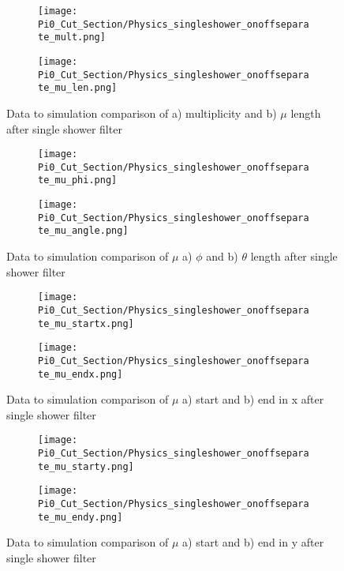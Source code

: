 \begin{figure}[H]
  \begin{subfigure}[t]{0.3\textwidth}
\texttt{[image: Pi0\_Cut\_Section/Physics\_singleshower\_onoffseparate\_mult.png]}
  \caption{ }
  \end{subfigure} 
  \hspace{34mm}
  \begin{subfigure}[t]{0.3\textwidth}
\texttt{[image: Pi0\_Cut\_Section/Physics\_singleshower\_onoffseparate\_mu\_len.png]}
  \caption{ }
  \end{subfigure} 
\caption{ Data to simulation comparison of a) multiplicity and b) $\mu$ length after single shower filter }
\label{fig:physics_singleshower_mulen}
\end{figure}

\begin{figure}[H]
  \begin{subfigure}[t]{0.3\textwidth}
\texttt{[image: Pi0\_Cut\_Section/Physics\_singleshower\_onoffseparate\_mu\_phi.png]}
  \caption{ }
  \end{subfigure} 
  \hspace{34mm}
  \begin{subfigure}[t]{0.3\textwidth}
\texttt{[image: Pi0\_Cut\_Section/Physics\_singleshower\_onoffseparate\_mu\_angle.png]}
  \caption{ }
  \end{subfigure} 
\caption{ Data to simulation comparison of $\mu$ a) $\phi$ and b) $\theta$ length after single shower filter }
\label{fig:physics_singleshower_muphi}
\end{figure}

\begin{figure}[H]
  \begin{subfigure}[t]{0.3\textwidth}
\texttt{[image: Pi0\_Cut\_Section/Physics\_singleshower\_onoffseparate\_mu\_startx.png]}
  \caption{ }
  \end{subfigure} 
  \hspace{34mm}
  \begin{subfigure}[t]{0.3\textwidth}
\texttt{[image: Pi0\_Cut\_Section/Physics\_singleshower\_onoffseparate\_mu\_endx.png]}
  \caption{ }
  \end{subfigure} 
\caption{ Data to simulation comparison of $\mu$ a) start and b) end in x after single shower filter }
\label{fig:physics_singleshower_x}
\end{figure}

\begin{figure}[H]
  \begin{subfigure}[t]{0.3\textwidth}
\texttt{[image: Pi0\_Cut\_Section/Physics\_singleshower\_onoffseparate\_mu\_starty.png]}
  \caption{ }
  \end{subfigure} 
  \hspace{34mm}
  \begin{subfigure}[t]{0.3\textwidth}
\texttt{[image: Pi0\_Cut\_Section/Physics\_singleshower\_onoffseparate\_mu\_endy.png]}
  \caption{ }
  \end{subfigure} 
\caption{ Data to simulation comparison of $\mu$ a) start and b) end in y after single shower filter }
\label{fig:physics_singleshower_y}
\end{figure}

